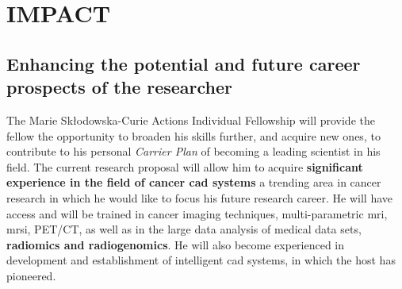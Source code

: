 \section{IMPACT}
\label{sec:impact}

\subsection{Enhancing the potential and future career prospects of the researcher}
\label{sec:enhancement}


The Marie Sk\l{}odowska-Curie Actions Individual Fellowship will provide the fellow the opportunity to broaden his skills further, and acquire new ones, to contribute to his personal \emph{Carrier Plan} of becoming a leading scientist in his field.
The current research proposal will allow him to acquire \textbf{significant experience in the field of cancer \ac{cad} systems} a trending area in cancer research in which he would like to focus his future research career.
He will have access and will be trained in cancer imaging techniques, multi-parametric \ac{mri}, \ac{mrsi}, PET/CT, as well as in the large data analysis of medical data sets, \textbf{radiomics and radiogenomics}.
He will also become experienced in development and establishment of intelligent \ac{cad} systems, in which the host has pioneered. 

